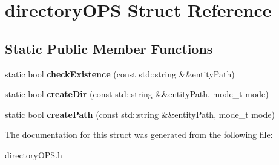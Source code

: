 \hypertarget{structdirectoryOPS}{}\section{directory\+O\+PS Struct Reference}
\label{structdirectoryOPS}
\subsection*{Static Public Member Functions}
\begin{DoxyCompactItemize}
\item 
static bool {\bfseries check\+Existence} (const std\+::string \&\&entity\+Path)\hypertarget{structdirectoryOPS_a7bfa5bdf814d7456c38c9a240f976b45}{}\label{structdirectoryOPS_a7bfa5bdf814d7456c38c9a240f976b45}

\item 
static bool {\bfseries create\+Dir} (const std\+::string \&\&entity\+Path, mode\+\_\+t mode)\hypertarget{structdirectoryOPS_a8348ec2461d5b741e06924c670856e0c}{}\label{structdirectoryOPS_a8348ec2461d5b741e06924c670856e0c}

\item 
static bool {\bfseries create\+Path} (const std\+::string \&\&entity\+Path, mode\+\_\+t mode)\hypertarget{structdirectoryOPS_aeef7ae01a60a09262683b43199936733}{}\label{structdirectoryOPS_aeef7ae01a60a09262683b43199936733}

\end{DoxyCompactItemize}


The documentation for this struct was generated from the following file\+:\begin{DoxyCompactItemize}
\item 
directory\+O\+P\+S.\+h\end{DoxyCompactItemize}
